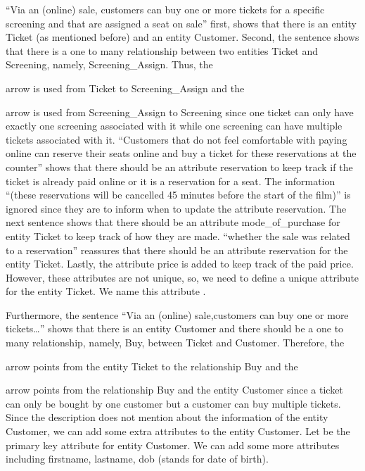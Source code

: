 \documentclass{article}
\newcommand{\key}[1]{\underline{\smash{#1}}}
\begin{document}
``Via an (online) sale, customers can buy one or more tickets for a specific
screening and that are assigned a seat on sale'' first, shows that there is an
entity Ticket (as mentioned before) and an entity Customer. Second, the sentence
shows that there is a one to many relationship between two entities Ticket and
Screening, namely, Screening\_Assign. Thus, the
arrow is used from Ticket to Screening\_Assign and the
arrow is used from Screening\_Assign to Screening since one ticket can only have
exactly one screening associated with it while one screening can have multiple
tickets associated with it. ``Customers that do not feel comfortable with paying
online can reserve their seats online and buy a ticket for these reservations
at the counter'' shows that there should be an attribute reservation to keep
track if the ticket is already paid online or it is a reservation for a seat.
The information ``(these reservations will be cancelled 45 minutes before the
start of the film)'' is ignored since they are to inform when to update the
attribute reservation. The next sentence shows that there should be an attribute
mode\_of\_purchase for entity Ticket to keep track of how they are made. ``whether
the sale was related to a reservation'' reassures that there should be an 
attribute reservation for the entity Ticket. Lastly, the attribute price is added
to keep track of the paid price. However, these attributes are not unique, so,
we need to define a unique attribute for the entity Ticket. We name this attribute
\key{ticket\_id}.

Furthermore, the sentence ``Via an (online) sale,customers can buy one or more
tickets\dots'' shows that there is an entity Customer and there should be a one
to many relationship, namely, Buy, between Ticket and Customer. Therefore, the
arrow points from the entity Ticket to the relationship Buy and the
arrow points from the relationship Buy and the entity Customer since a ticket can
only be bought by one customer but a customer can buy multiple tickets. Since
the description does not mention about the information of the entity Customer,
we can add some extra attributes to the entity Customer. Let \key{customer\_id}
be the primary key attribute for entity Customer. We can add some more attributes
including firstname, lastname, dob (stands for date of birth).
\end{document}
